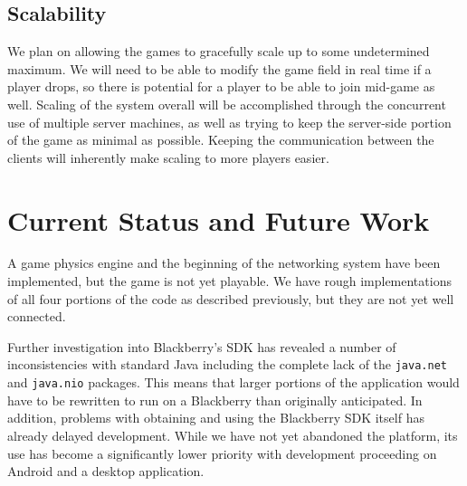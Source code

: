 \documentclass{sig-alternate}
\begin{document}
\subsection{Scalability}

We plan on allowing the games to gracefully scale up to some undetermined
maximum.  We will need to be able to modify the game field in real time if
a player drops, so there is potential for a player to be able to join
mid-game as well.   Scaling of the system overall will be accomplished
through the concurrent use of multiple server machines, as well as trying
to keep the server-side portion of the game as minimal as possible.
Keeping the communication between the clients will inherently make scaling
to more players easier.



\section{Current Status and Future Work}
\label{current status}


A game physics engine and the beginning of the networking system have been
implemented, but the game is not yet playable.  We have rough
implementations of all four portions of the code as described previously,
but they are not yet well connected.

Further investigation into Blackberry's SDK has revealed a number of
inconsistencies with standard Java including the complete lack of the
\texttt{java.net} and \texttt{java.nio} packages.  This means that larger
portions of the application would have to be rewritten to run on a
Blackberry than originally anticipated.  In addition, problems with
obtaining and using the Blackberry SDK itself has already delayed
development.  While we have not yet abandoned the platform, its use has
become a significantly lower priority with development proceeding on
Android and a desktop application.



\balance
\end{document}
